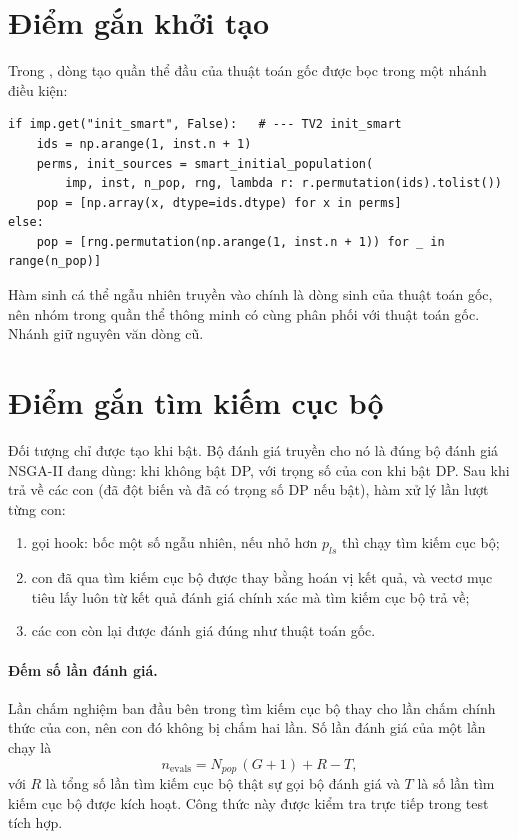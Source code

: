 \section{Điểm gắn khởi tạo}

Trong , dòng tạo quần thể đầu của thuật toán gốc được bọc trong một nhánh điều kiện:
\begin{Verbatim}
if imp.get("init_smart", False):   # --- TV2 init_smart
    ids = np.arange(1, inst.n + 1)
    perms, init_sources = smart_initial_population(
        imp, inst, n_pop, rng, lambda r: r.permutation(ids).tolist())
    pop = [np.array(x, dtype=ids.dtype) for x in perms]
else:
    pop = [rng.permutation(np.arange(1, inst.n + 1)) for _ in range(n_pop)]
\end{Verbatim}
Hàm sinh cá thể ngẫu nhiên truyền vào chính là dòng sinh của thuật toán gốc, nên nhóm 
trong quần thể thông minh có cùng phân phối với thuật toán gốc. Nhánh  giữ nguyên văn dòng
cũ.

\section{Điểm gắn tìm kiếm cục bộ}

Đối tượng  chỉ được tạo khi  bật. Bộ đánh giá
truyền cho nó là đúng bộ đánh giá NSGA-II đang dùng:  khi không bật DP,
 với trọng số của con khi bật DP. Sau khi  trả về các con (đã
đột biến và đã có trọng số DP nếu bật), hàm  xử lý lần lượt từng con:
\begin{enumerate}
  \item gọi hook: bốc một số ngẫu nhiên, nếu nhỏ hơn $p_{ls}$ thì chạy tìm kiếm cục bộ;
  \item con đã qua tìm kiếm cục bộ được thay bằng hoán vị kết quả, và vectơ mục tiêu lấy luôn từ kết quả
        đánh giá chính xác mà tìm kiếm cục bộ trả về;
  \item các con còn lại được đánh giá đúng như thuật toán gốc.
\end{enumerate}

\paragraph{Đếm số lần đánh giá.} Lần chấm nghiệm ban đầu bên trong tìm kiếm cục bộ thay cho lần chấm
chính thức của con, nên con đó không bị chấm hai lần. Số lần đánh giá của một lần chạy là
\begin{equation}
  n_{\text{evals}} = N_{pop}\,(G + 1) + R - T,
  \label{eq:nevals}
\end{equation}
với $R$ là tổng số lần tìm kiếm cục bộ thật sự gọi bộ đánh giá và $T$ là số lần tìm kiếm cục bộ được
kích hoạt. Công thức này được kiểm tra trực tiếp trong test tích hợp.


